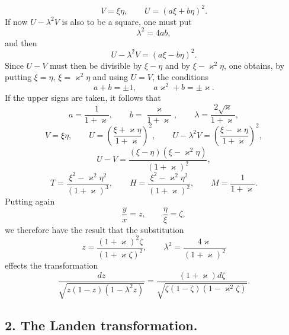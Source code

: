 \documentclass[11pt]{article}
\begin{document}
\[
V=\xi\eta,\qquad U=(a\xi+b\eta)^2.
\]
If now $U-\lambda^2V$ is also to be a square, one must put
\[
\lambda^2=4ab,
\]
and then
\[
U-\lambda^2V=(a\xi-b\eta)^2.
\]
Since $U-V$ must then be divisible by $\xi-\eta$ and by $\xi-\varkappa^2\eta$, one obtains, by putting $\xi=\eta$, $\xi=\varkappa^2\eta$ and using $U=V$, the conditions
\[
a+b=\pm1,\qquad a\varkappa^2+b=\pm\varkappa.
\]
If the upper signs are taken, it follows that
\[
a=\frac1{1+\varkappa},\qquad
b=\frac{\varkappa}{1+\varkappa},\qquad
\lambda=\frac{2\sqrt{\varkappa}}{1+\varkappa},
\]
\[
V=\xi\eta,\qquad
U=\left(\frac{\xi+\varkappa\eta}{1+\varkappa}\right)^2,\qquad
U-\lambda^2V=\left(\frac{\xi-\varkappa\eta}{1+\varkappa}\right)^2,
\]
\[
U-V=\frac{(\xi-\eta)(\xi-\varkappa^2\eta)}{(1+\varkappa)^2},
\]
\[
T=\frac{\xi^2-\varkappa^2\eta^2}{(1+\varkappa)^3},\qquad
H=\frac{\xi^2-\varkappa^2\eta^2}{(1+\varkappa)^2},\qquad
M=\frac1{1+\varkappa}.
\]
Putting again
\[
\frac{y}{x}=z,\qquad \frac{\eta}{\xi}=\zeta,
\]
we therefore have the result that the substitution
\begin{equation}
z=\frac{(1+\varkappa)^2\zeta}{(1+\varkappa\zeta)^2},
\qquad
\lambda^2=\frac{4\varkappa}{(1+\varkappa)^2}
\tag{2}
\end{equation}
effects the transformation
\begin{equation}
\frac{dz}{\sqrt{z(1-z)(1-\lambda^2z)}}
=
\frac{(1+\varkappa)d\zeta}{\sqrt{\zeta(1-\zeta)(1-\varkappa^2\zeta)}}.
\tag{3}
\end{equation}

\subsection*{2. The Landen transformation.}
\end{document}
